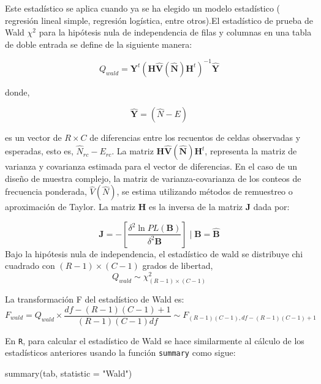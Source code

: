 \documentclass[
  12pt,
]{book}
\newenvironment{Shaded}{\begin{snugshade}}{\end{snugshade}}
\newcommand{\AttributeTok}[1]{\textcolor[rgb]{0.77,0.63,0.00}{#1}}
\newcommand{\FunctionTok}[1]{\textcolor[rgb]{0.00,0.00,0.00}{#1}}
\newcommand{\NormalTok}[1]{#1}
\newcommand{\StringTok}[1]{\textcolor[rgb]{0.31,0.60,0.02}{#1}}
\begin{document}
Este estadístico se aplica cuando ya se ha elegido un modelo estadístico ( regresión lineal simple, regresión logística, entre otros).El estadístico de prueba de Wald \(\chi^{2}\) para la hipótesis nula de independencia de filas y columnas en una tabla de doble entrada se define de la siguiente manera:

\[
Q_{wald}=\hat{\boldsymbol{Y}^{t}}\left(\boldsymbol{H}\hat{\boldsymbol{V}}\left(\hat{\boldsymbol{N}}\right)\boldsymbol{H}^{t}\right)^{-1}\hat{\boldsymbol{Y}}
\]

donde,

\[
\hat{\boldsymbol{Y}}=\left(\hat{N}-E\right)
\]

es un vector de \(R\times C\) de diferencias entre los recuentos de celdas observadas y esperadas, esto es, \(\hat{N}_{rc}-E_{rc}\). La matriz \(\boldsymbol{H}\hat{\boldsymbol{V}}\left(\hat{\boldsymbol{N}}\right)\boldsymbol{H}^{t}\), representa la matriz de varianza y covarianza estimada para el vector de diferencias. En el caso de un diseño de muestra complejo, la matriz de varianza-covarianza de los conteos de frecuencia ponderada, \(\hat{V}\left(\hat{N}\right)\), se estima utilizando métodos de remuestreo o aproximación de Taylor. La matriz \(\boldsymbol{H}\) es la inversa de la matriz \(\boldsymbol{J}\) dada por:

\[
\boldsymbol{J}=-\left[\frac{\delta^{2}\ln PL\left(\boldsymbol{B}\right)}{\delta^{2}\boldsymbol{B}}\right] \mid \boldsymbol{B}=\hat{\boldsymbol{B}}
\]
Bajo la hipótesis nula de independencia, el estadístico de wald se distribuye chi cuadrado con \(\left(R-1\right)\times\left(C-1\right)\) grados de libertad,
\[
Q_{wald}\sim\chi_{\left(R-1\right)\times\left(C-1\right)}^{2}
\]

La transformación F del estadístico de Wald es:
\[
F_{wald}=Q_{wald}\times\frac{df-\left(R-1\right)\left(C-1\right)+1}{\left(R-1\right)\left(C-1\right)df}\sim F_{\left(R-1\right)\left(C-1\right),df-\left(R-1\right)\left(C-1\right)+1}
\]

En \texttt{R}, para calcular el estadístico de Wald se hace similarmente al cálculo de los estadísticos anteriores usando la función \texttt{summary} como sigue:

\begin{Shaded}
\begin{Highlighting}[]
\FunctionTok{summary}\NormalTok{(tab, }\AttributeTok{statistic =} \StringTok{"Wald"}\NormalTok{)}
\end{Highlighting}
\end{Shaded}
\end{document}
